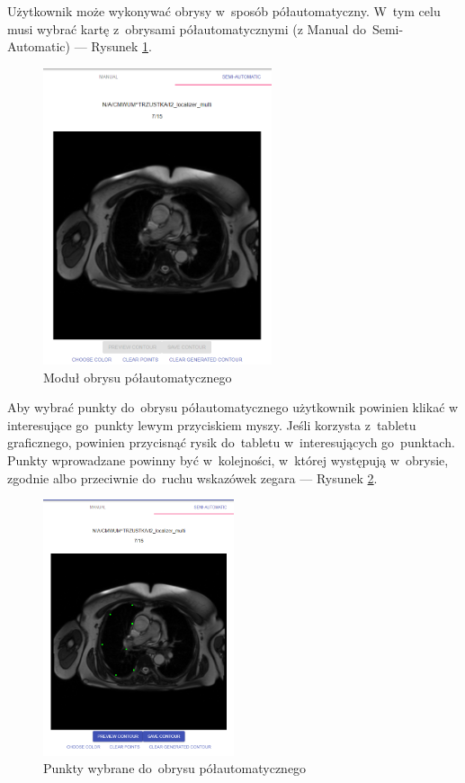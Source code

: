 \documentclass[a4paper,11pt,twoside,openright]{report}
\theoremstyle{definition}
\begin{document}
\pagebreak

Użytkownik może wykonywać obrysy w~sposób półautomatyczny. W~tym celu musi
wybrać kartę z~obrysami półautomatycznymi (z Manual do~Semi-Automatic) ---
Rysunek \ref{fig:10}.

\begin{figure}[h!]
	\center
	\includegraphics[width=0.6\textwidth]{10}
	\caption{Moduł obrysu półautomatycznego}
    	\label{fig:10}
\end{figure}

Aby wybrać punkty do~obrysu półautomatycznego użytkownik powinien klikać w
interesujące go~punkty lewym przyciskiem myszy. Jeśli korzysta z~tabletu
graficznego, powinien przycisnąć rysik do~tabletu w~interesujących go~punktach.
Punkty wprowadzane powinny być w~kolejności, w~której występują w~obrysie,
zgodnie albo przeciwnie do~ruchu wskazówek zegara --- Rysunek \ref{fig:11}.

\pagebreak

\begin{figure}[h!]
	\center
	\includegraphics[width=0.5\textwidth]{11}
	\caption{Punkty wybrane do~obrysu półautomatycznego}
    	\label{fig:11}
\end{figure}
\end{document}
